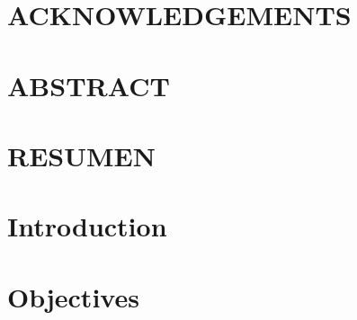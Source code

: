 \documentclass[pdftex]{pucthesis}	%
\begin{document}


 \label{acknowledgements} %
\chapter*{ACKNOWLEDGEMENTS}           


\cleardoublepage



\tableofcontents
{} \label{listoffigures}
\listoffigures
{} \label{listoftables}
\listoftables
\cleardoublepage



 \label{abstract}
\chapter*{ABSTRACT}

\cleardoublepage

 \label{resumen}
\chapter*{RESUMEN}

\cleardoublepage



\chapter[INTRODUCTION]{Introduction}


\chapter[OBJECTIVES]{Objectives} \label{obj}

\end{document}
